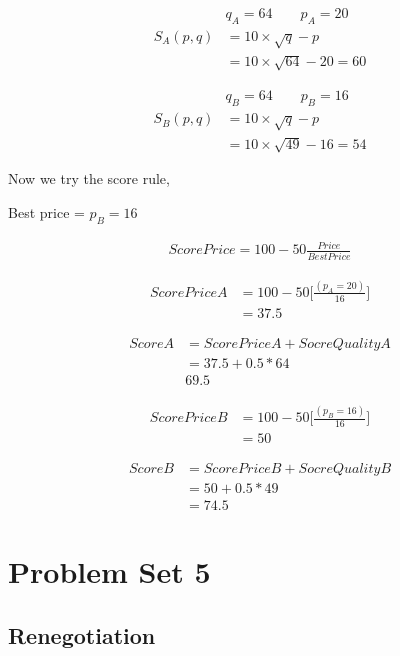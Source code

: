\documentclass[11pt]{article} %
\begin{document}
        \begin{align*}
        & q_A= 64 \qquad p_A=20 \\
            S_{A}(p,q) & = 10 \times \sqrt{q}-p \\
             & =  10\times\sqrt{64} - 20  = 60  
        \end{align*}



        \begin{align*}
        & q_B  = 64 \qquad p_B=16 \\
            S_{B}(p,q) & = 10 \times \sqrt{q}-p \\
           & = 10 \times \sqrt{49}-16 =54
        \end{align*}

Now we try the score rule, 

Best price =  $p_B=16$


\begin{align*}
	ScorePrice = 100 - 50\frac{Price}{BestPrice}
\end{align*}


\begin{align*}
	ScorePriceA & = 100 - 50\Bigg[ \frac{(p_A = 20)}{16} \Bigg] \\
	 & = 37.5
\end{align*}

\begin{align*}
	Score A & = ScorePriceA + SocreQualityA \\
	& = 37.5 + 0.5*64 \\
	& 69.5
\end{align*}

\begin{align*}
	ScorePriceB & = 100 - 50 \Bigg[ \frac{(p_B = 16)}{16} \Bigg] \\
	 & = 50
\end{align*}

\begin{align*}
	Score B & = ScorePriceB + SocreQualityB \\
	& = 50 + 0.5*49 \\
	& = 74.5
\end{align*}

\section{Problem Set 5}

\subsection{Renegotiation}
\end{document}

